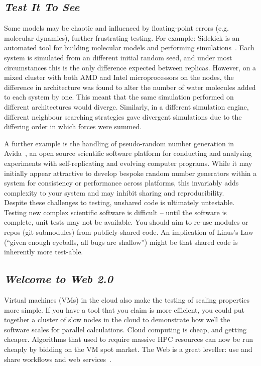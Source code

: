 \documentclass[a4paper,11pt]{article}
\begin{document}
\subsection{{\emph{Test It To See}}}

Some models may be chaotic and influenced by floating-point errors
(e.g. molecular dynamics), further frustrating testing. For example:
Sidekick is an automated tool for building molecular models and
performing simulations~\cite{Hall2014Sidekick}. Each system is
simulated from an different initial random seed, and under most
circumstances this is the only difference expected between
replicas. However, on a mixed cluster with both AMD and Intel
microprocessors on the nodes, the difference in architecture was found
to alter the number of water molecules added to each system by
one. This meant that the same simulation performed on different
architectures would diverge. Similarly, in a different simulation
engine, different neighbour searching strategies gave divergent
simulations due to the differing order in which forces were summed.

A further example is the handling of pseudo-random number generation
in Avida~\cite{ofria+wilke:2004}, an open source scientific software
platform for conducting and analysing experiments with
self-replicating and evolving computer programs. While it may
initially appear attractive to develop bespoke random number
generators within a system for consistency or performance across
platforms, this invariably adds complexity to your system and may
inhibit sharing and reproducibility.\\

 Despite these
challenges to testing, unshared code is ultimately untestable.
Testing new complex scientific software is difficult -- until the
software is complete, unit tests may not be available. You should aim
to re-use modules or repos (git submodules) from publicly-shared
code. An implication of Linus's Law (``given enough eyeballs, all bugs
are shallow'') might be that shared code is inherently more test-able.


\subsection{{\emph{Welcome to Web 2.0}}}

Virtual machines (VMs) in the cloud also make the testing of scaling
properties more simple.  If you have a tool that you claim is more
efficient, you could put together a cluster of slow nodes in the cloud
to demonstrate how well the software scales for parallel calculations.
Cloud computing is cheap, and getting cheaper. Algorithms that used to
require massive HPC resources can now be run cheaply by bidding on the
VM spot market. The Web is a great leveller: use and share workflows
and web services~\cite{crick-et-al:2009b,oabarriaga-et-al:2014}.\\
\end{document}
